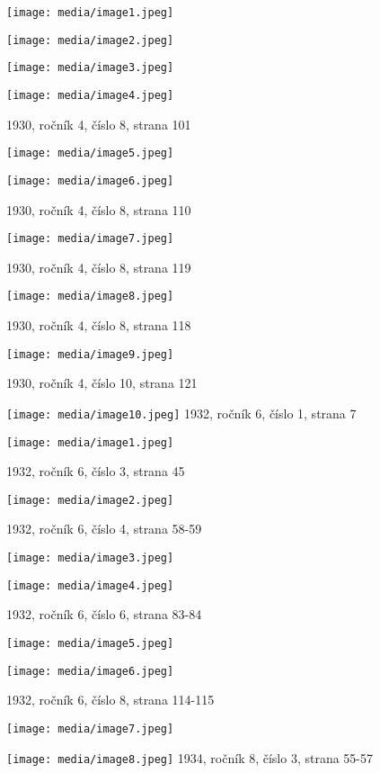\texttt{[image: media/image1.jpeg]}

\texttt{[image: media/image2.jpeg]}

\texttt{[image: media/image3.jpeg]}

\texttt{[image: media/image4.jpeg]}

1930, ročník 4, číslo 8, strana 101

\texttt{[image: media/image5.jpeg]}

\texttt{[image: media/image6.jpeg]}

1930, ročník 4, číslo 8, strana 110

\texttt{[image: media/image7.jpeg]}

1930, ročník 4, číslo 8, strana 119

\texttt{[image: media/image8.jpeg]}

1930, ročník 4, číslo 8, strana 118

\texttt{[image: media/image9.jpeg]}

1930, ročník 4, číslo 10, strana 121

\texttt{[image: media/image10.jpeg]}
1932, ročník 6, číslo 1, strana 7

\texttt{[image: media/image1.jpeg]}

1932, ročník 6, číslo 3, strana 45

\texttt{[image: media/image2.jpeg]}

1932, ročník 6, číslo 4, strana 58-59

\texttt{[image: media/image3.jpeg]}

\texttt{[image: media/image4.jpeg]}

1932, ročník 6, číslo 6, strana 83-84

\texttt{[image: media/image5.jpeg]}

\texttt{[image: media/image6.jpeg]}

1932, ročník 6, číslo 8, strana 114-115

\texttt{[image: media/image7.jpeg]}

\texttt{[image: media/image8.jpeg]}
1934, ročník 8, číslo 3, strana 55-57

